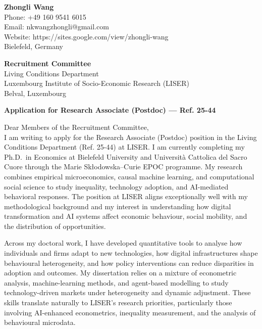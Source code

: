 \documentclass[11pt]{article}
\begin{document}
\noindent
\textbf{Zhongli Wang} \\
Phone: +49 160 9541 6015 \\
Email: nkwangzhongli@gmail.com \\
Website: https://sites.google.com/view/zhongli-wang \\
Bielefeld, Germany \\

\vspace{0.5cm}

\noindent
\textbf{Recruitment Committee} \\
Living Conditions Department \\
Luxembourg Institute of Socio-Economic Research (LISER) \\
Belval, Luxembourg \\

\vspace{0.5cm}

\noindent
\textbf{Application for Research Associate (Postdoc) — Ref. 25-44} \\

\vspace{0.3cm}

\noindent Dear Members of the Recruitment Committee,\\[0.2cm]

I am writing to apply for the Research Associate (Postdoc) position in the Living Conditions Department (Ref. 25-44) at LISER. I am currently completing my Ph.D.\ in Economics at Bielefeld University and Università Cattolica del Sacro Cuore through the Marie Skłodowska–Curie EPOC programme. My research combines empirical microeconomics, causal machine learning, and computational social science to study inequality, technology adoption, and AI-mediated behavioral responses. The position at LISER aligns exceptionally well with my methodological background and my interest in understanding how digital transformation and AI systems affect economic behaviour, social mobility, and the distribution of opportunities.

Across my doctoral work, I have developed quantitative tools to analyse how individuals and firms adapt to new technologies, how digital infrastructures shape behavioural heterogeneity, and how policy interventions can reduce disparities in adoption and outcomes. My dissertation relies on a mixture of econometric analysis, machine-learning methods, and agent-based modelling to study technology-driven markets under heterogeneity and dynamic adjustment. These skills translate naturally to LISER’s research priorities, particularly those involving AI-enhanced econometrics, inequality measurement, and the analysis of behavioural microdata.
\end{document}
